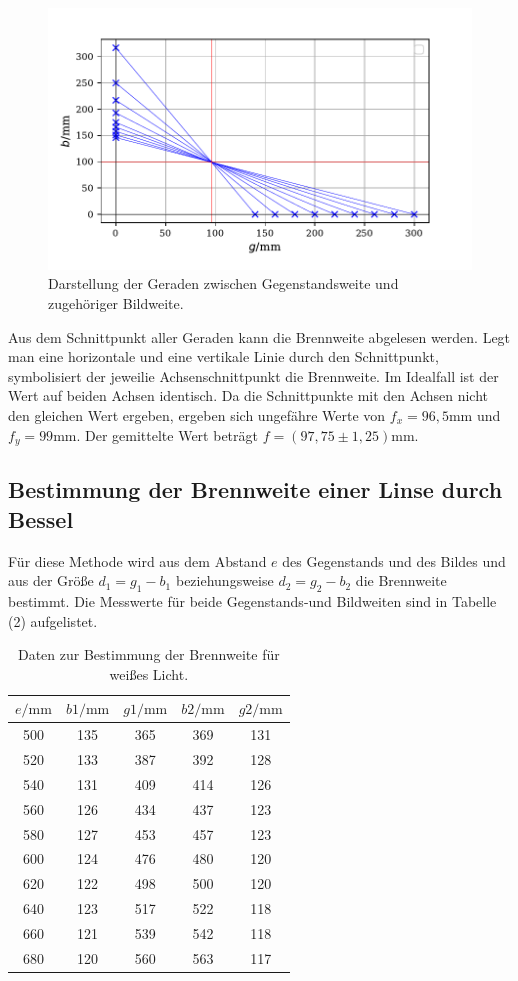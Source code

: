 \begin{figure}[H]
  \centering
  \includegraphics{plot1.pdf}
  \caption{Darstellung der Geraden zwischen Gegenstandsweite und zugehöriger Bildweite.}
  \label{fig:plot}
\end{figure}

Aus dem Schnittpunkt aller Geraden kann die Brennweite abgelesen werden. Legt man eine horizontale und eine vertikale Linie durch den Schnittpunkt, symbolisiert der jeweilie Achsenschnittpunkt die Brennweite. Im Idealfall ist der Wert auf beiden Achsen identisch.
Da die Schnittpunkte mit den Achsen nicht den gleichen Wert ergeben, ergeben sich ungefähre Werte von $f_x = 96,5 \si{\milli\meter}$ und $f_y = 99\si{\milli\meter}$. Der gemittelte  Wert beträgt $f = (97,75 \pm 1,25)\si{\milli\meter}$.


\subsection{Bestimmung der Brennweite einer Linse durch Bessel}
Für diese Methode wird aus dem Abstand $e$ des Gegenstands und des Bildes und aus der Größe $d_1 = g_1-b_1$ beziehungsweise $d_2 = g_2-b_2$ die Brennweite bestimmt.
Die Messwerte für beide Gegenstands-und Bildweiten sind in Tabelle (2) aufgelistet.
\begin{table}[H]
\centering
\caption{Daten zur Bestimmung der Brennweite für weißes Licht.}
\label{tab:einzel1}
\begin{tabular}{c c c c c}
\toprule
$e/\si{\milli\meter}$ & $b1/\si{\milli\meter}$ & $g1/\si{\milli\meter}$ & $b2/\si{\milli\meter}$ & $g2/\si{\milli\meter}$ \\
\midrule
500 &135	& 365	& 369	& 131\\
520 &133	& 387	& 392	& 128\\
540 &131	& 409	& 414	& 126\\
560 &126	& 434	& 437	& 123\\
580 &127	& 453	& 457	& 123\\
600 &124	& 476	& 480	& 120\\
620 &122	& 498	& 500	& 120\\
640 &123	& 517	& 522	& 118\\
660 &121	& 539	& 542	& 118\\	
680 &120	& 560	& 563	& 117\\
\bottomrule
\end{tabular}
\end{table}

